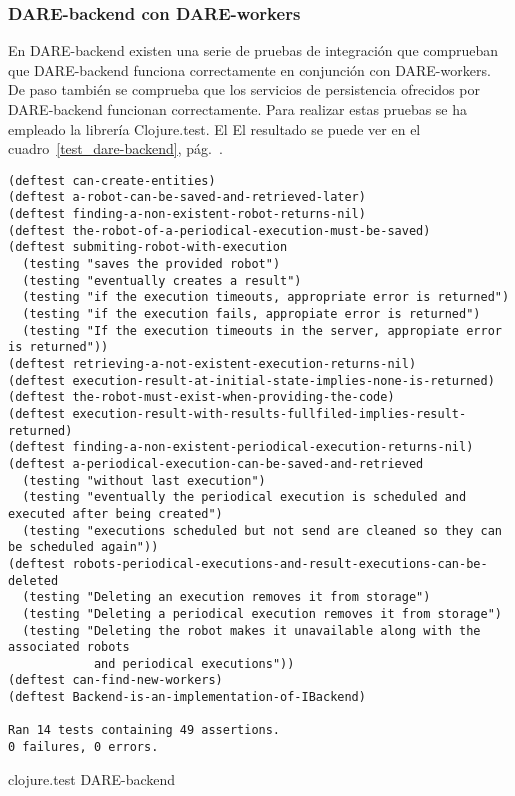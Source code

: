 \subsubsection{DARE-backend con DARE-workers}
En DARE-backend existen una serie de pruebas de integración que
comprueban que DARE-backend funciona correctamente en conjunción con
DARE-workers. De paso también se comprueba que los servicios de
persistencia ofrecidos por DARE-backend funcionan correctamente. Para
realizar estas pruebas se ha empleado la librería Clojure.test. El El
resultado se puede ver en el cuadro~\ref{test_dare-backend},
pág.~\pageref{test_dare-backend}.

\begin{table}[hbp]
\begingroup
  \fontsize{9pt}{11pt}\selectfont
\begin{verbatim}
(deftest can-create-entities)
(deftest a-robot-can-be-saved-and-retrieved-later)
(deftest finding-a-non-existent-robot-returns-nil)
(deftest the-robot-of-a-periodical-execution-must-be-saved)
(deftest submiting-robot-with-execution
  (testing "saves the provided robot")
  (testing "eventually creates a result")
  (testing "if the execution timeouts, appropriate error is returned")
  (testing "if the execution fails, appropiate error is returned")
  (testing "If the execution timeouts in the server, appropiate error is returned"))
(deftest retrieving-a-not-existent-execution-returns-nil)
(deftest execution-result-at-initial-state-implies-none-is-returned)
(deftest the-robot-must-exist-when-providing-the-code)
(deftest execution-result-with-results-fullfiled-implies-result-returned)
(deftest finding-a-non-existent-periodical-execution-returns-nil)
(deftest a-periodical-execution-can-be-saved-and-retrieved
  (testing "without last execution")
  (testing "eventually the periodical execution is scheduled and executed after being created")
  (testing "executions scheduled but not send are cleaned so they can be scheduled again"))
(deftest robots-periodical-executions-and-result-executions-can-be-deleted
  (testing "Deleting an execution removes it from storage")
  (testing "Deleting a periodical execution removes it from storage")
  (testing "Deleting the robot makes it unavailable along with the associated robots
            and periodical executions"))
(deftest can-find-new-workers)
(deftest Backend-is-an-implementation-of-IBackend)

Ran 14 tests containing 49 assertions.
0 failures, 0 errors.
\end{verbatim}
\endgroup
\caption{clojure.test DARE-backend}
\label{test_dare-backend}
\end{table}
